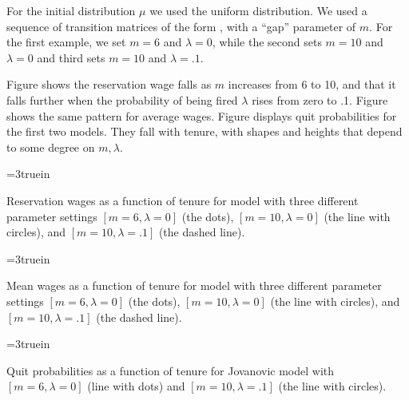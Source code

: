    For the initial distribution $\mu$ we used the uniform distribution.
We used a sequence of transition
matrices of the form , with a ``gap'' parameter of $m$.
For the first example, we set $m=6$ and $\lambda=0$, while
the second sets $m=10$ and $\lambda=0$ and third sets
$m=10$ and $\lambda=.1$.

   Figure  %
   shows the reservation wage falls as $m$ increases
from 6 to 10, and that it falls further when the probability
of being fired $\lambda$ rises from zero to .1.  Figure  
shows the same pattern for average wages.  Figure  %
displays quit probabilities for the first two models.  They
fall with tenure, with shapes and heights that depend  to
some degree on $m, \lambda$.



\centerline{\epsfxsize=3truein}
\caption{Reservation wages as a function of tenure for model with three
different parameter settings $[m=6, \lambda=0]$ (the dots),
$[m=10, \lambda=0]$ (the line with circles), and
$[m=10, \lambda=.1]$ (the dashed line).}
\endfigure


\centerline{\epsfxsize=3truein}
\caption{Mean wages as a function of tenure for model with three different
parameter settings $[m=6,\lambda=0]$ (the dots), $[m=10, \lambda=0]$
(the line with circles), and $[m=10, \lambda=.1]$ (the dashed line).}
\endfigure


\centerline{\epsfxsize=3truein}
\caption{Quit probabilities as a function of tenure for Jovanovic
model with $[m=6, \lambda=0]$ (line with dots) and $[m=10, \lambda=.1]$
(the line with circles).}
\endfigure


